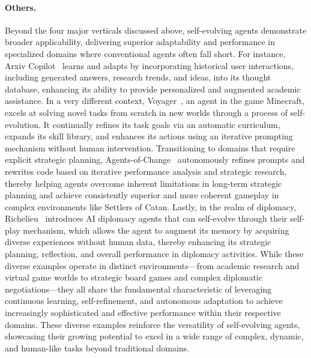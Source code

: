 \paragraph{Others.}
Beyond the four major verticals discussed above, self-evolving agents demonstrate broader applicability, delivering superior adaptability and performance in specialized domains where conventional agents often fall short. 
For instance, Arxiv Copilot~\citep{lin2024arxivcopilot} learns and adapts by incorporating historical user interactions, including generated answers, research trends, and ideas, into its thought database, enhancing its ability to provide personalized and augmented academic assistance. 
In a very different context, Voyager~\citep{wang2023voyager}, an agent in the game Minecraft, excels at solving novel tasks from scratch in new worlds through a process of self-evolution. It continually refines its task goals via an automatic curriculum, expands its skill library, and enhances its actions using an iterative prompting mechanism without human intervention. Transitioning to domains that require explicit strategic planning, Agents-of-Change~\citep{belle2025agents} autonomously refines prompts and rewrites code based on iterative performance analysis and strategic research, thereby helping agents overcome inherent limitations in long-term strategic planning and achieve consistently superior and more coherent gameplay in complex environments like Settlers of Catan. Lastly, in the realm of diplomacy, Richelieu~\citep{zhao2024richelieu} introduces AI diplomacy agents that can self-evolve through their self-play mechanism, which allows the agent to augment its memory by acquiring diverse experiences without human data, thereby enhancing its strategic planning, reflection, and overall performance in diplomacy activities. While these diverse examples operate in distinct environments—from academic research and virtual game worlds to strategic board games and complex diplomatic negotiations—they all share the fundamental characteristic of leveraging continuous learning, self-refinement, and autonomous adaptation to achieve increasingly sophisticated and effective performance within their respective domains. 
These diverse examples reinforce the versatility of self-evolving agents, showcasing their growing potential to excel in a wide range of complex, dynamic, and human-like tasks beyond traditional domains.
